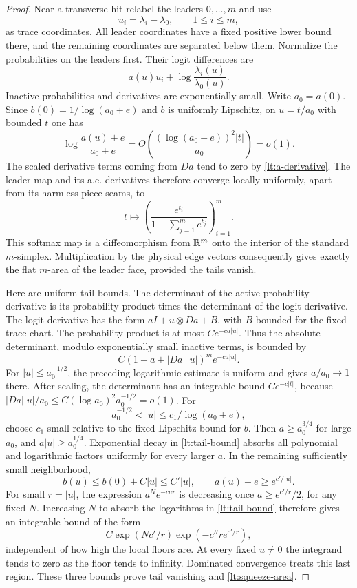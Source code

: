 \begin{proof}
Near a transverse hit relabel the leaders $0,\ldots,m$ and use
\[
 u_i=\lambda_i-\lambda_0,\qquad 1\leq i\leq m,
\]
as trace coordinates.  All leader coordinates have a fixed positive
lower bound there, and the remaining coordinates are separated below
them.  Normalize the probabilities on the leaders first.  Their
logit differences are
\[
 a(u)u_i+\log\frac{\lambda_i(u)}{\lambda_0(u)}.
\]
Inactive probabilities and derivatives are exponentially small.
Write $a_0=a(0)$.  Since
$b(0)=1/\log(a_0+e)$ and $b$ is uniformly Lipschitz, on
$u=t/a_0$ with bounded $t$ one has
\[
 \log\frac{a(u)+e}{a_0+e}
       =O\left(\frac{(\log(a_0+e))^2|t|}{a_0}\right)=o(1).
\]
The scaled derivative terms coming from $Da$ tend to zero by
\eqref{lt:a-derivative}.  The leader map and its a.e. derivatives
therefore converge locally uniformly, apart from its harmless
piece seams, to
\[
 t\longmapsto
 \left(\frac{e^{t_i}}{1+\sum_{j=1}^m e^{t_j}}\right)_{i=1}^m.
\]
This softmax map is a diffeomorphism from $\mathbb R^m$ onto the interior
of the standard $m$-simplex.  Multiplication by the physical edge
vectors consequently gives exactly the flat $m$-area of the leader
face, provided the tails vanish.

Here are uniform tail bounds.  The determinant of the active
probability derivative is its probability product times the
determinant of the logit derivative.  The logit derivative has the
form $aI+u\otimes Da+B$, with $B$ bounded for the fixed trace chart.
The probability product is at most $C e^{-ca|u|}$.  Thus the
absolute determinant, modulo exponentially small inactive terms,
is bounded by
\begin{equation}
 C(1+a+|Da|\,|u|)^m e^{-ca|u|}.
 \label{lt:tail-bound}
\end{equation}
For $|u|\leq a_0^{-1/2}$, the preceding logarithmic estimate is
uniform and gives $a/a_0\to1$ there.  After scaling, the
determinant has an integrable bound $Ce^{-c|t|}$, because
$|Da||u|/a_0\leq C(\log a_0)^2a_0^{-1/2}=o(1)$.
For
\[
 a_0^{-1/2}<|u|\leq c_1/\log(a_0+e),
\]
choose $c_1$ small relative to the fixed Lipschitz bound for $b$.
Then $a\geq a_0^{3/4}$ for large $a_0$, and
$a|u|\geq a_0^{1/4}$.  Exponential decay in
\eqref{lt:tail-bound} absorbs all polynomial and logarithmic
factors uniformly for every larger $a$.
In the remaining sufficiently small neighborhood,
\[
 b(u)\leq b(0)+C|u|\leq C'|u|,
 \qquad a(u)+e\geq e^{c'/|u|}.
\]
For small $r=|u|$, the expression $a^N e^{-car}$ is decreasing
once $a\geq e^{c'/r}/2$, for any fixed $N$.  Increasing $N$ to
absorb the logarithms in \eqref{lt:tail-bound} therefore gives an
integrable bound of the form
\[
 C\exp(Nc'/r)\exp(-c''r e^{c'/r}),
\]
independent of how high the local floors are.  At every fixed
$u\ne0$ the integrand tends to zero as the floor tends to infinity.
Dominated convergence treats this last region.  These three bounds
prove tail vanishing and \eqref{lt:squeeze-area}.


\end{proof}
